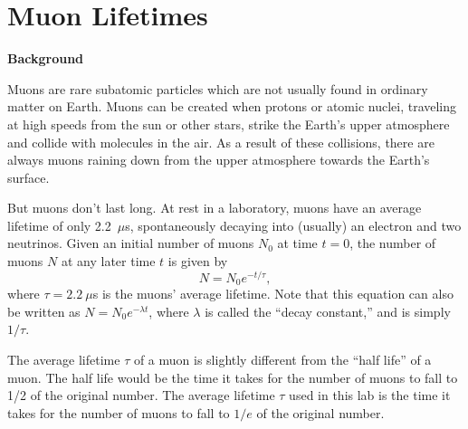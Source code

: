 \section{Muon Lifetimes}


\makelabheader %

\bigskip

\textbf{Background} 

Muons are rare subatomic particles which are not usually found in ordinary matter on Earth.  Muons can be created when protons or atomic nuclei, traveling at high speeds from the sun or other stars, strike the Earth's upper atmosphere and collide with molecules in the air.  As a result of these collisions, there are always muons raining down from the upper atmosphere towards the Earth's surface.

But muons don't last long.  At rest in a laboratory, muons have an average lifetime of only 2.2~$\mu$s, spontaneously decaying into (usually) an electron and two neutrinos.  Given an initial number of muons $N_0$ at time $t=0$, the number of muons $N$ at any later time $t$ is given by
\begin{equation}
N=N_0 e^{-t/\tau},
\end{equation}
where $\tau = 2.2~\mu$s is the muons' average lifetime.  Note that this equation can also be written as $N=N_0 e^{-\lambda t}$, where $\lambda$ is called the ``decay constant,'' and is simply $1/\tau$.  

The average lifetime $\tau$ of a muon is slightly different from the ``half life'' of a muon.  The half life would be the time it takes for the number of muons to fall to 1/2 of the original number. The average lifetime $\tau$ used in this lab is the time it takes for the number of muons to fall to $1/e$ of the original number.

